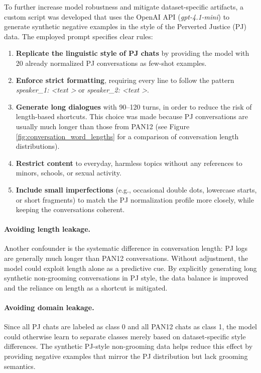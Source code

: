 To further increase model robustness and mitigate dataset-specific artifacts, a custom script was developed that uses the OpenAI API (\textit{gpt-4.1-mini}) to generate synthetic negative examples in the style of the Perverted Justice (PJ) data. The employed prompt specifies clear rules:
\begin{enumerate}
\item \textbf{Replicate the linguistic style of PJ chats} by providing the model with 20 already normalized PJ conversations as few-shot examples.
\item \textbf{Enforce strict formatting}, requiring every line to follow the pattern \textit{speaker\_1: \textless text \textgreater} or \textit{speaker\_2: \textless text \textgreater}.
\item \textbf{Generate long dialogues} with 90–120 turns, in order to reduce the risk of length-based shortcuts. This choice was made because PJ conversations are usually much longer than those from PAN12 (see Figure \ref{fig:conversation_word_lengths} for a comparison of conversation length distributions).
\item \textbf{Restrict content} to everyday, harmless topics without any references to minors, schools, or sexual activity.
\item \textbf{Include small imperfections} (e.g., occasional double dots, lowercase starts, or short fragments) to match the PJ normalization profile more closely, while keeping the conversations coherent.
\end{enumerate}

\paragraph{Avoiding length leakage.}
Another confounder is the systematic difference in conversation length: PJ logs are generally much longer than PAN12 conversations. Without adjustment, the model could exploit length alone as a predictive cue. By explicitly generating long synthetic non-grooming conversations in PJ style, the data balance is improved and the reliance on length as a shortcut is mitigated.

\paragraph{Avoiding domain leakage.}
Since all PJ chats are labeled as class 0 and all PAN12 chats as class 1, the model could otherwise learn to separate classes merely based on dataset-specific style differences. The synthetic PJ-style non-grooming data helps reduce this effect by providing negative examples that mirror the PJ distribution but lack grooming semantics.


